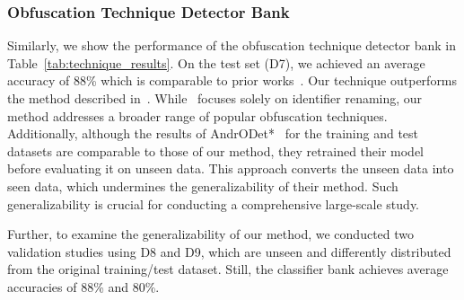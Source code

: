 \subsubsection{{Obfuscation Technique Detector Bank}}

Similarly, we show the performance of the obfuscation technique detector bank in Table~\ref{tab:technique_results}. On the test set (D7), we achieved an average accuracy of 88\% which is comparable to prior works~\cite{kuhnel2015fast, conti2022obfuscation, mirzaei2019androdet}. Our technique outperforms the method described in~\cite{mirzaei2019androdet}. While~\cite{kuhnel2015fast} focuses solely on identifier renaming, our method addresses a broader range of popular obfuscation techniques. Additionally, although the results of AndrODet*~\cite{conti2022obfuscation} for the training and test datasets are comparable to those of our method, they retrained their model before evaluating it on unseen data. This approach converts the unseen data into seen data, which undermines the generalizability of their method. Such generalizability is crucial for conducting a comprehensive large-scale study.


Further, to examine the generalizability of our method, we conducted two validation studies using D8 and D9, which are unseen and differently distributed from the original training/test dataset. Still, the classifier bank achieves average accuracies of 88\% and 80\%.


\begin{table}[h]
\caption{Obfuscation technique detection - Results}
\label{tab:technique_results}
\end{table}


